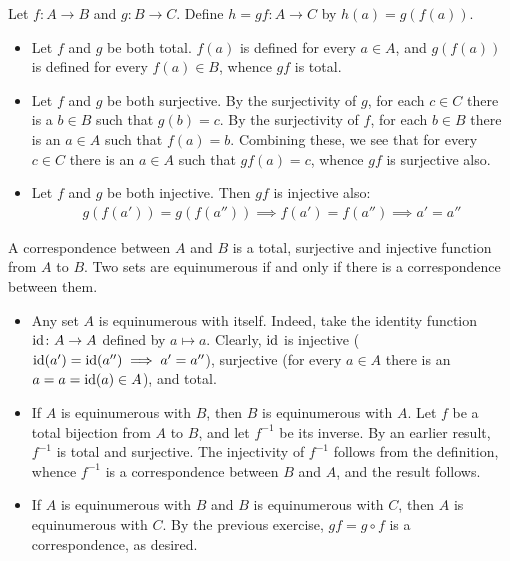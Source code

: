 \begin{exercise}[1.2]
  Let $f\colon A \to B$ and $g\colon B\to C$.
  Define $h = gf \colon A \to C$ by $h(a) = g(f(a))$.
  \begin{itemize}
    \item Let $f$ and $g$ be both total.
    $f(a)$ is defined for every $a \in A$, and $g(f(a))$ is defined for every $f(a) \in B$, whence $gf$ is total.
    \item Let $f$ and $g$ be both surjective.
    By the surjectivity of $g$, for each $c \in C$ there is a $b \in B$ such that $g(b) = c$.
    By the surjectivity of $f$, for each $b \in B$ there is an $a \in A$ such that $f(a) = b$.
    Combining these, we see that for every $c \in C$ there is an $a \in A$ such that $gf(a) = c$, whence $gf$ is surjective also.
    \item Let $f$ and $g$ be both injective.
    Then $gf$ is injective also:
    \begin{align*}
      g(f(a')) = g(f(a'')) \implies f(a') = f(a'') \implies a' = a''
    \end{align*}
  \end{itemize}
\end{exercise}

\begin{exercise}[1.3]
  A correspondence between $A$ and $B$ is a total, surjective and injective function from $A$ to $B$.
  Two sets are equinumerous if and only if there is a correspondence between them.
  \begin{itemize}
    \item Any set $A$ is equinumerous with itself.
    Indeed, take the identity function $\operatorname{id}\colon A \to A$ defined by $a \mapsto a$.
    Clearly, $\operatorname{id}$ is injective ($\operatorname{id}(a') = \operatorname{id}(a'') \implies a' = a''$), surjective (for every $a \in A$ there is an $a = a = \operatorname{id}(a) \in A$), and total.
    \item If $A$ is equinumerous with $B$, then $B$ is equinumerous with $A$.
    Let $f$ be a total bijection from $A$ to $B$, and let $f^{-1}$ be its inverse.
    By an earlier result, $f^{-1}$ is total and surjective.
    The injectivity of $f^{-1}$ follows from the definition, whence $f^{-1}$ is a correspondence between $B$ and $A$, and the result follows.
    \item If $A$ is equinumerous with $B$ and $B$ is equinumerous with $C$, then $A$ is equinumerous with $C$.
    By the previous exercise, $gf = g \circ f$ is a correspondence, as desired.
  \end{itemize}
\end{exercise}

